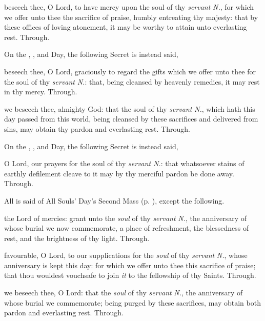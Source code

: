  beseech thee, O Lord, to have mercy upon the soul of thy \textit{servant} \textit{N.}, for which we offer unto thee the sacrifice of praise, humbly entreating thy majesty: that by these offices of loving atonement, it may be worthy to attain unto everlasting rest. Through.

\begin{rubric}
    On the , , and  Day, the following Secret is instead said,
\end{rubric}
 beseech thee, O Lord, graciously to regard the gifts which we offer unto thee for the soul of thy \textit{servant} \textit{N.}: that, being cleansed by heavenly remedies, it may rest in thy mercy. Through.

 we beseech thee, almighty God: that the soul of thy \textit{servant} \textit{N.}, which hath this day passed from this world, being cleansed by these sacrifices and delivered from sins, may obtain thy pardon and everlasting rest. Through.

\begin{rubric}
    On the , , and  Day, the following Secret is instead said,
\end{rubric}
 O Lord, our prayers for the soul of thy \textit{servant} \textit{N.}: that whatsoever stains of earthly defilement cleave to it may by thy merciful pardon be done away. Through.

\begin{rubric}
    All is said of All Souls' Day's Second Mass (p. \pageref{AllSoulsII}), except the following.
\end{rubric}
 the Lord of mercies: grant unto the \textit{soul} of thy \textit{servant} \textit{N.}, the anniversary of whose burial we now commemorate, a place of refreshment, the blessedness of rest, and the brightness of thy light. Through.

 favourable, O Lord, to our supplications for the \textit{soul} of thy \textit{servant} \textit{N.}, whose anniversary is kept this day: for which we offer unto thee this sacrifice of praise; that thou wouldest vouchsafe to join \textit{it} to the fellowship of thy Saints. Through.

 we beseech thee, O Lord: that the \textit{soul} of thy \textit{servant} \textit{N.}, the anniversary of whose burial we commemorate; being purged by these sacrifices, may obtain both pardon and everlasting rest. Through.

